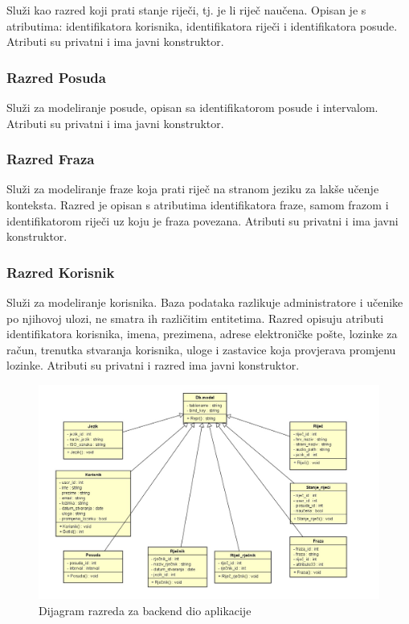 Služi kao razred koji prati stanje riječi, tj. je li riječ naučena. Opisan je s atributima: identifikatora korisnika, identifikatora riječi i identifikatora posude. Atributi su privatni i ima javni konstruktor.

\subsubsection{Razred Posuda}

Služi za modeliranje posude, opisan sa identifikatorom posude i intervalom.
Atributi su privatni i ima javni konstruktor.

\subsubsection{Razred Fraza}

Služi za modeliranje fraze koja prati riječ na stranom jeziku za lakše
učenje konteksta. Razred je opisan s atributima identifikatora fraze, samom frazom i identifikatorom riječi uz koju je fraza povezana. Atributi su privatni i ima javni konstruktor.


\subsubsection{Razred Korisnik}

Služi za modeliranje korisnika. Baza podataka razlikuje administratore i učenike po njihovoj ulozi,
ne smatra ih različitim entitetima. Razred opisuju atributi identifikatora korisnika, imena, prezimena,
adrese elektroničke pošte, lozinke za račun, trenutka stvaranja korisnika, uloge i zastavice
koja provjerava promjenu lozinke. Atributi su privatni i razred ima javni konstruktor.

\begin{figure}[H]
	\includegraphics[scale=0.35]{dijagrami/class_back.jpeg}
	\centering
	\caption{Dijagram razreda za backend dio aplikacije}
	\label{fig:class-back}
\end{figure}

